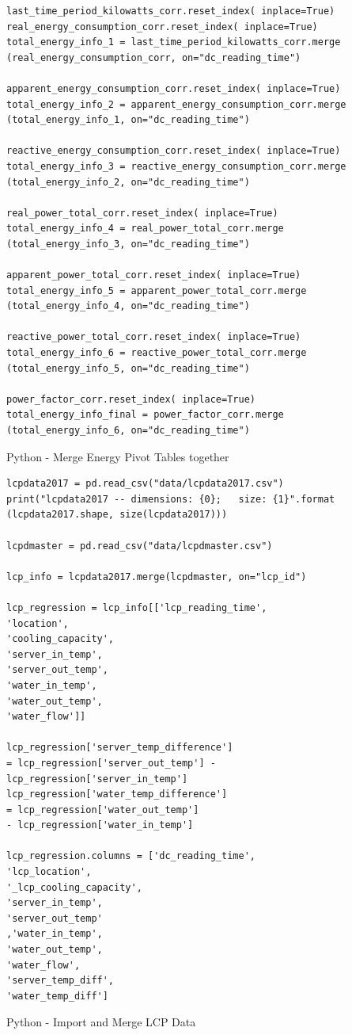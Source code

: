 \documentclass[12pt]{scrartcl}
\begin{document}
\begin{listing}[H]
\begin{verbatim}
last_time_period_kilowatts_corr.reset_index( inplace=True)
real_energy_consumption_corr.reset_index( inplace=True)
total_energy_info_1 = last_time_period_kilowatts_corr.merge
(real_energy_consumption_corr, on="dc_reading_time")

apparent_energy_consumption_corr.reset_index( inplace=True)
total_energy_info_2 = apparent_energy_consumption_corr.merge
(total_energy_info_1, on="dc_reading_time")

reactive_energy_consumption_corr.reset_index( inplace=True)
total_energy_info_3 = reactive_energy_consumption_corr.merge
(total_energy_info_2, on="dc_reading_time")

real_power_total_corr.reset_index( inplace=True)
total_energy_info_4 = real_power_total_corr.merge
(total_energy_info_3, on="dc_reading_time")

apparent_power_total_corr.reset_index( inplace=True)
total_energy_info_5 = apparent_power_total_corr.merge
(total_energy_info_4, on="dc_reading_time")

reactive_power_total_corr.reset_index( inplace=True)
total_energy_info_6 = reactive_power_total_corr.merge
(total_energy_info_5, on="dc_reading_time")

power_factor_corr.reset_index( inplace=True)
total_energy_info_final = power_factor_corr.merge
(total_energy_info_6, on="dc_reading_time")

\end{verbatim}
\caption{Python - Merge Energy Pivot Tables together}
\label{list:[Python - Merge Energy Pivot Tables together]}
\end{listing}

\begin{listing}[H]
\begin{verbatim}
lcpdata2017 = pd.read_csv("data/lcpdata2017.csv")
print("lcpdata2017 -- dimensions: {0};   size: {1}".format
(lcpdata2017.shape, size(lcpdata2017)))

lcpdmaster = pd.read_csv("data/lcpdmaster.csv")

lcp_info = lcpdata2017.merge(lcpdmaster, on="lcp_id")

lcp_regression = lcp_info[['lcp_reading_time',
'location',
'cooling_capacity',
'server_in_temp',
'server_out_temp',
'water_in_temp',
'water_out_temp',
'water_flow']]

lcp_regression['server_temp_difference'] 
= lcp_regression['server_out_temp'] - 
lcp_regression['server_in_temp']
lcp_regression['water_temp_difference'] 
= lcp_regression['water_out_temp'] 
- lcp_regression['water_in_temp']

lcp_regression.columns = ['dc_reading_time',
'lcp_location',
'_lcp_cooling_capacity',
'server_in_temp',
'server_out_temp'
,'water_in_temp',
'water_out_temp',
'water_flow',
'server_temp_diff',
'water_temp_diff']

\end{verbatim}
\caption{Python - Import and Merge LCP Data}
\label{list:[Python - Import and Merge LCP Data]}
\end{listing}
\end{document}

